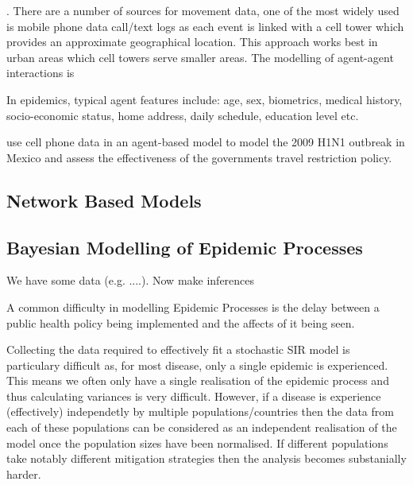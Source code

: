 \documentclass[11pt,a4paper]{article}
\theoremstyle{break}
\begin{document}
  . There are a number of sources for movement data, one of the most widely used is mobile phone data call/text logs as each event is linked with a cell tower which provides an approximate geographical location. This approach works best in urban areas which cell towers serve smaller areas. The modelling of agent-agent interactions is

  In epidemics, typical agent features include: age, sex, biometrics, medical history, socio-economic status, home address, daily schedule, education level etc.

  \cite[]{agent_based_model_of_epidemic_spread} use cell phone data in an agent-based model to model the 2009 H1N1 outbreak in Mexico and assess the effectiveness of the governments travel restriction policy.

\subsection*{Network Based Models}

\subsection{Bayesian Modelling of Epidemic Processes}


  \par We have some data (e.g. ....). Now make inferences

  \par A common difficulty in modelling Epidemic Processes is the delay between a public health policy being implemented and the affects of it being seen. %


  \par Collecting the data required to effectively fit a stochastic SIR model is particulary difficult as, for most disease, only a single epidemic is experienced. This means we often only have a single realisation of the epidemic process and thus calculating variances is very difficult. However, if a disease is experience (effectively) independetly by multiple populations/countries then the data from each of these populations can be considered as an independent realisation of the model once the population sizes have been normalised. If different populations take notably different mitigation strategies then the analysis becomes substanially harder.
\end{document}

